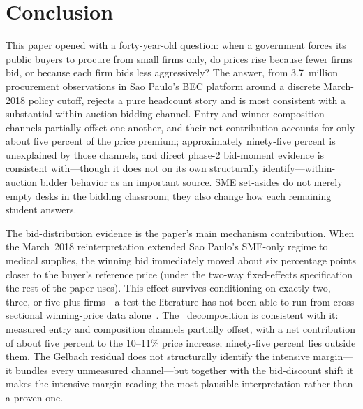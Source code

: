 \section{Conclusion}

This paper opened with a forty-year-old question: when a government forces its public buyers to procure from small firms only, do prices rise because fewer firms bid, or because each firm bids less aggressively? The answer, from 3.7~million procurement observations in Sao Paulo's BEC platform around a discrete March-2018 policy cutoff, rejects a pure headcount story and is most consistent with a substantial within-auction bidding channel. Entry and winner-composition channels partially offset one another, and their net contribution accounts for only about five percent of the price premium; approximately ninety-five percent is unexplained by those channels, and direct phase-2 bid-moment evidence is consistent with---though it does not on its own structurally identify---within-auction bidder behavior as an important source. SME set-asides do not merely empty desks in the bidding classroom; they also change how each remaining student answers.

The bid-distribution evidence is the paper's main mechanism contribution. When the March~2018 reinterpretation extended Sao Paulo's SME-only regime to medical supplies, the winning bid immediately moved about six percentage points closer to the buyer's reference price (under the two-way fixed-effects specification the rest of the paper uses). This effect survives conditioning on exactly two, three, or five-plus firms---a test the literature has not been able to run from cross-sectional winning-price data alone~\citep{marion2007, krasnokutskaya2011, athey2013}. The~\citet{gelbach2016} decomposition is consistent with it: measured entry and composition channels partially offset, with a net contribution of about five percent to the 10--11\% price increase; ninety-five percent lies outside them. The Gelbach residual does not structurally identify the intensive margin---it bundles every unmeasured channel---but together with the bid-discount shift it makes the intensive-margin reading the most plausible interpretation rather than a proven one.

